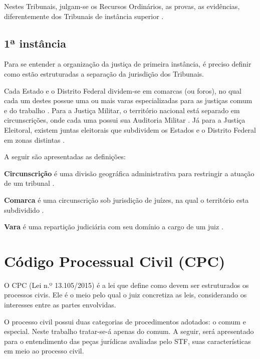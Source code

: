 Nestes Tribunais, julgam-se os Recursos Ordinários, as provas, as evidências, diferentemente dos Tribunais de instância superior \cite{amendoeira_jr_manual_2012}.

\subsection{1ª instância}

Para se entender a organização da justiça de primeira instância, é preciso definir como estão estruturadas a separação da jurisdição dos Tribunais.

Cada Estado e o Distrito Federal dividem-se em comarcas (ou foros), no qual cada um destes possue uma ou mais varas especializadas  para as justiças comum e do trabalho \cite{amendoeira_jr_manual_2012}. Para a Justiça Militar, o território nacional está separado em circunscrições, onde cada uma possui sua Auditoria Militar \cite{noauthor_lei_1992}. Já para a Justiça Eleitoral, existem juntas eleitorais que subdividem os Estados e o Distrito Federal em zonas distintas \cite{brasil_constituicao_1988}.

A seguir são apresentadas as definições:

\begin{description}
	\item \textbf{Circunscrição} é uma divisão geográfica administrativa para restringir a atuação de um tribunal \cite[p. 71]{guimaraes_dicionario_2012}.
	\item \textbf{Comarca} é uma circunscrição sob jurisdição de juízes, na qual o território esta subdividido \cite[p. 75]{guimaraes_dicionario_2012}.
    \item \textbf{Vara} é uma repartição judiciária com seu domínio a cargo de um juiz \cite[p. 259]{guimaraes_dicionario_2012}.
\end{description}


\section{Código Processual Civil (CPC)}
\label{sec:cpc}

O CPC (Lei n.º 13.105/2015) é a lei que define como devem ser estruturados os processos civis. Ele é o meio pelo qual o juiz concretiza as leis, considerando os interesses entre as partes envolvidas.

O processo civil possui duas categorias de procedimentos adotados: o comum e especial. Neste trabalho tratar-se-á apenas do comum. A seguir, será apresentado para o entendimento das peças jurídicas avaliadas pelo STF, suas características em meio ao processo civil.

